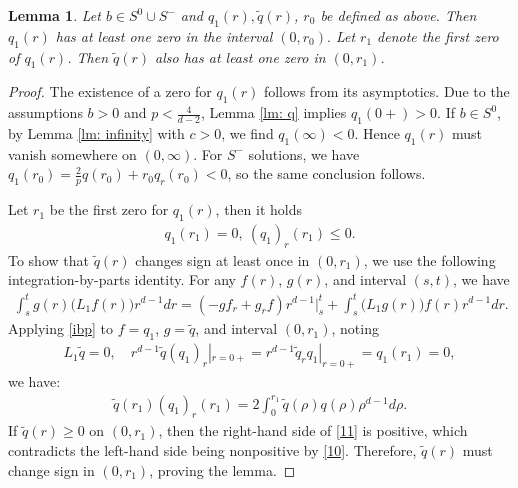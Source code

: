 \documentclass[12pt]{amsart}
\newtheorem{lemma}[theorem]{Lemma}
\begin{document}
    \begin{lemma} \label{lm: qt} 
    Let $b \in S^0\cup S^-$ and $q_1(r), \tilde q(r)$, $r_0$ be defined as above. Then $q_1(r)$ has at least one zero in the interval $(0, r_0). $ Let $r_1$ denote the first zero of $q_1(r)$. Then $\tilde q(r)$ also has at least one zero in $(0, r_1)$. 
    \end{lemma}
    \begin{proof} 
    The existence of a zero for $q_1(r)$ follows from its asymptotics. Due to  the assumptions $b>0$ and $p<\frac  4{d-2}$, Lemma \ref{lm: q} implies $q_1(0+)>0$. If $b \in S^0$, 
    by Lemma \ref{lm: infinity} with $c>0$, 
we find $q_1(\infty)<0$. Hence $q_1(r)$ must vanish somewhere on $(0, \infty)$. For $S^-$ solutions, we have  $q_1(r_0)=\frac 2p q(r_0)+r_0q_r(r_0)<0$, so the same conclusion follows. 
    
    Let $r_1$ be the first zero for $q_1(r)$, then it holds 
    \begin{align}\label{10}
    q_1(r_1)=0, \ (q_1)_r(r_1)\le0. 
    \end{align}
    To show that $\tilde q(r)$ changes sign at least once in $(0,r_1)$, we use the following integration-by-parts identity. For any $f(r)$, $g(r)$, and interval $(s,t)$, we have 
    \begin{align}\label{ibp}
    \int_s^t g(r) \big(L_1f(r) \big) r^{d-1} dr=(-g f_r+g_r f)r^{d-1}|_s^t+\int _s^t \big(L_1 g(r) \big) f(r) r^{d-1} dr. 
    \end{align}
 Applying \eqref{ibp} to $f=q_1$, $g=\tilde q$, and interval $(0, r_1)$, noting 
 \begin{align*}
 L_1 \tilde q=0, \quad r^{d-1}\tilde q(q_1)_r |_{r=0+}=r^{d-1}\tilde q_rq_1|_{r=0+}=q_1(r_1)=0,
 \end{align*}
   we have:
   \begin{align}\label{11}
   \tilde q(r_1)(q_1)_r(r_1)=2\int_0^{r_1} \tilde q(\rho)q(\rho)\rho^{d-1} d\rho. 
   \end{align}  
    If $\tilde q(r)\ge 0$ on $(0,r_1)$, then the right-hand side of \eqref{11} is positive, which contradicts the left-hand side being nonpositive by \eqref{10}. Therefore, $\tilde q(r)$ must change sign in $(0, r_1)$, proving the lemma. 
    \end{proof}
    
\end{document}

